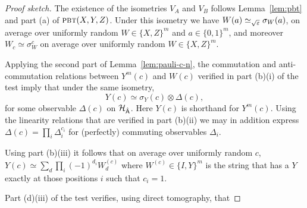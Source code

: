 \begin{proof}[Proof sketch]
The existence of the isometries $V_A$ and $V_B$ follows Lemma~\ref{lem:pbt} and part (a) of $\textsc{pbt}(X,Y,Z)$. 
 Under this isometry we have $W(a) \simeq_{\sqrt{\varepsilon}} \sigma_W(a)$, on average over uniformly random $W\in\{X,Z\}^m$ and $a\in\{0,1\}^m$, and moreover $W_c \simeq \sigma_W^c$ on average over uniformly random $W\in\{X,Z\}^m$. 

Applying the second part of Lemma~\ref{lem:pauli-c-n},  the  commutation and anti-commutation relations between $Y^m(c)$ and $W(c)$ verified in part (b)(i) of the test imply that under the same isometry,
$$ Y(c) \simeq \sigma_Y(c) \otimes {\Delta}(c),$$
for some observable ${\Delta}(c)$ on ${\mathcal{H}}_{\hat{{\textsf{A}}}}$. Here $Y(c)$ is shorthand for $Y^m(c)$. Using the linearity relations that are verified in part (b)(ii) we may in addition express $\Delta(c) = \prod_i \Delta_{i}^{c_i}$ for (perfectly) commuting observables $\Delta_i$. 




Using part (b)(iii) it follows that on average over uniformly random $c$, $Y(c)\simeq \sum_d \prod_i (-1)^{d_i} W^{(c)}_d$ where $W^{(c)} \in \{I,Y\}^m$ is the string that has a $Y$ exactly at those positions $i$ such that $c_i=1$. 

Part (d)(iii) of the test verifies, using direct tomography, that 





\end{proof}
